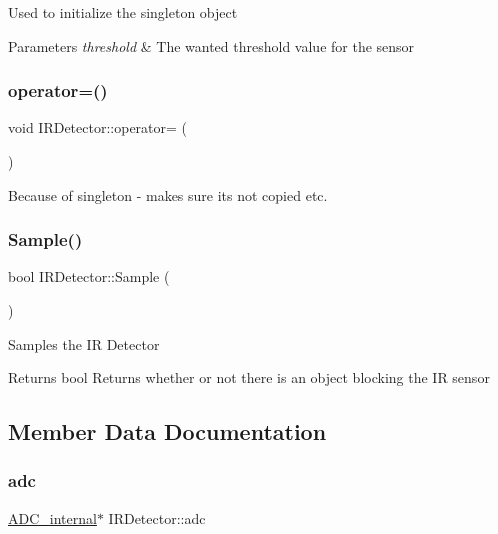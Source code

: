 Used to initialize the singleton object 
\begin{DoxyParams}{Parameters}
{\em threshold} & The wanted threshold value for the sensor \\
\hline
\end{DoxyParams}
\hypertarget{class_i_r_detector_af620ee70d4ea6fa4984434d89a0fb453}{}\label{class_i_r_detector_af620ee70d4ea6fa4984434d89a0fb453} 
\subsubsection{\texorpdfstring{operator=()}{operator=()}}
{\footnotesize\ttfamily void I\+R\+Detector\+::operator= (\begin{DoxyParamCaption}\item[{const \hyperlink{class_i_r_detector}{I\+R\+Detector} \&}]{ }\end{DoxyParamCaption})\hspace{0.3cm}{\ttfamily [delete]}}

Because of singleton -\/ makes sure its not copied etc. \hypertarget{class_i_r_detector_a9b48eae026b000b3013d3e546ee3347c}{}\label{class_i_r_detector_a9b48eae026b000b3013d3e546ee3347c} 
\subsubsection{\texorpdfstring{Sample()}{Sample()}}
{\footnotesize\ttfamily bool I\+R\+Detector\+::\+Sample (\begin{DoxyParamCaption}{ }\end{DoxyParamCaption})}

Samples the IR Detector \begin{DoxyReturn}{Returns}
bool Returns whether or not there is an object blocking the IR sensor 
\end{DoxyReturn}


\subsection{Member Data Documentation}
\hypertarget{class_i_r_detector_ac1426886f2c13ccf25e4e579a05af5cd}{}\label{class_i_r_detector_ac1426886f2c13ccf25e4e579a05af5cd} 
\subsubsection{\texorpdfstring{adc}{adc}}
{\footnotesize\ttfamily \hyperlink{class_a_d_c__internal}{A\+D\+C\+\_\+internal}$\ast$ I\+R\+Detector\+::adc\hspace{0.3cm}{\ttfamily [private]}}

